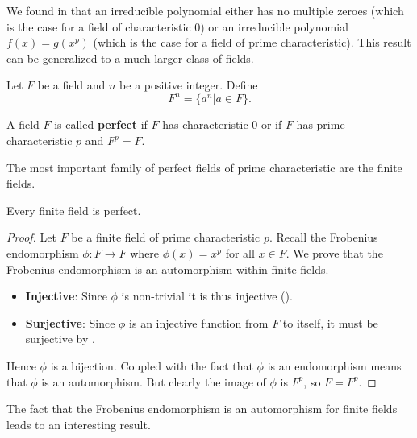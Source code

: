 We found in  that an irreducible polynomial either has no multiple zeroes (which is the case for a field of characteristic 0) or an irreducible polynomial $f(x) = g(x^p)$ (which is the case for a field of prime characteristic). This result can be generalized to a much larger class of fields.

\begin{definition}
    Let $F$ be a field and $n$ be a positive integer. Define
    \[
        F^n = \{a^n \vert a \in F\}.
    \]
\end{definition}

\begin{definition}
    A field $F$ is called \textbf{perfect} if $F$ has characteristic 0 or if $F$ has prime characteristic $p$ and $F^p = F$.
\end{definition}

The most important family of perfect fields of prime characteristic are the finite fields.

\begin{theorem}\label{thrm-finite-field-is-perfect}
    Every finite field is perfect.
\end{theorem}
\begin{proof}
    Let $F$ be a finite field of prime characteristic $p$. Recall the Frobenius endomorphism $\phi: F \to F$ where $\phi(x) = x^p$ for all $x \in F$. We prove that the Frobenius endomorphism is an automorphism within finite fields.
    \begin{itemize}
        \item \textbf{Injective}: Since $\phi$ is non-trivial it is thus injective ().
        \item \textbf{Surjective}: Since $\phi$ is an injective function from $F$ to itself, it must be surjective by .
    \end{itemize}
    Hence $\phi$ is a bijection. Coupled with the fact that $\phi$ is an endomorphism means that $\phi$ is an automorphism. But clearly the image of $\phi$ is $F^p$, so $F = F^p$.
\end{proof}

The fact that the Frobenius endomorphism is an automorphism for finite fields leads to an interesting result.

